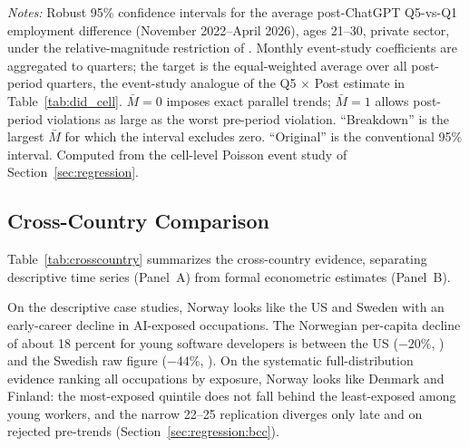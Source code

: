 \documentclass[12pt]{article}
\begin{document}
\begin{table}[tp]
  \centering
  \caption{HonestDiD sensitivity of the Q5-vs-Q1 employment effect to violations of parallel trends, ages 21--30, private sector.}
  \label{tab:honest_did}
  
  \begin{minipage}{\textwidth}\footnotesize\textit{Notes:} Robust 95\% confidence intervals for the average post-ChatGPT Q5-vs-Q1 employment difference (November 2022--April 2026), ages 21--30, private sector, under the relative-magnitude restriction of \citet{rambachan2023}. Monthly event-study coefficients are aggregated to quarters; the target is the equal-weighted average over all post-period quarters, the event-study analogue of the Q5 $\times$ Post estimate in Table~\ref{tab:did_cell}. $\bar{M}=0$ imposes exact parallel trends; $\bar{M}=1$ allows post-period violations as large as the worst pre-period violation. ``Breakdown'' is the largest $\bar{M}$ for which the interval excludes zero. ``Original'' is the conventional 95\% interval. Computed from the cell-level Poisson event study of Section~\ref{sec:regression}.\end{minipage}
\end{table}


\subsection{Cross-Country Comparison}\label{sec:discussion:crosscountry}

Table~\ref{tab:crosscountry} summarizes the cross-country evidence, separating descriptive time series (Panel~A) from formal econometric estimates (Panel~B).

On the descriptive case studies, Norway looks like the US and Sweden with an early-career decline in AI-exposed occupations. The Norwegian per-capita decline of about 18 percent for young software developers is between the US ($-20\%$, \citealp{brynjolfsson2025}) and the Swedish raw figure ($-44\%$, \citealp{lodefalk2026}). On the systematic full-distribution evidence ranking all occupations by exposure, Norway looks like Denmark and Finland: the most-exposed quintile does not fall behind the least-exposed among young workers, and the narrow 22--25 replication diverges only late and on rejected pre-trends (Section~\ref{sec:regression:bcc}).
\end{document}

